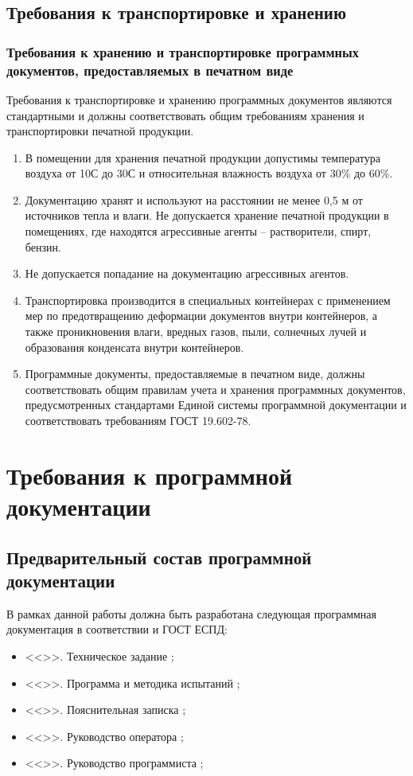 \documentclass[a4paper,12pt,reqno]{article}
\begin{document}
  \subsection{Требования к транспортировке и хранению}
  \subsubsection{Требования к хранению и транспортировке программных документов, предоставляемых в печатном виде}
  Требования к транспортировке и хранению программных документов являются стандартными и должны соответствовать общим требованиям хранения и транспортировки печатной продукции.
  \begin{enumerate}
    \item В помещении для хранения печатной продукции допустимы температура воздуха от 10\degree С до 30\degree С и относительная влажность воздуха от 30\% до 60\%.
    \item Документацию хранят и используют на расстоянии не менее 0,5 м от источников тепла и влаги. Не допускается хранение печатной продукции в помещениях, где находятся агрессивные агенты -- растворители, спирт, бензин.
    \item Не допускается попадание на документацию агрессивных агентов.
    \item Транспортировка производится в специальных контейнерах с применением мер по предотвращению деформации документов внутри контейнеров, а также проникновения влаги, вредных газов, пыли, солнечных лучей и образования конденсата внутри контейнеров.
    \item Программные документы, предоставляемые в печатном виде, должны соответствовать общим правилам учета и хранения программных документов, предусмотренных стандартами Единой системы программной документации и соответствовать требованиям ГОСТ 19.602-78.
  \end{enumerate}

  \newpage
  \section{Требования к программной документации}
  \subsection{Предварительный состав программной документации}
  \label{sec:doclist}
  В рамках данной работы должна быть разработана следующая программная документация в соответствии и ГОСТ ЕСПД:
  \begin{itemize}
    \item <<\CRTname>>. Техническое задание \cite{gostTZ};
    \item <<\CRTname>>. Программа и методика испытаний \cite{gostPMI};
    \item <<\CRTname>>. Пояснительная записка \cite{gostPZ};
    \item <<\CRTname>>. Руководство оператора \cite{gostRO};
    \item <<\CRTname>>. Руководство программиста \cite{gostRP};
  \end{itemize}
\end{document}
